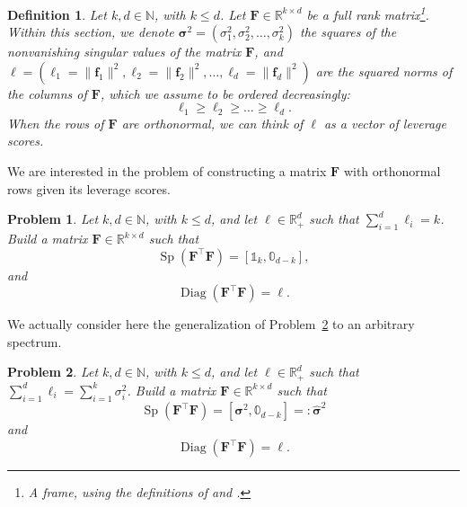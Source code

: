 \documentclass[twoside,11pt]{book}
\newtheorem{definition}{Definition}
\newtheorem{problem}{Problem}
\numberwithin{theorem}{chapter}
\numberwithin{definition}{chapter}
\numberwithin{proposition}{chapter}
\numberwithin{corollary}{chapter}
\numberwithin{example}{chapter}
\numberwithin{lemma}{chapter}
\numberwithin{assumption}{chapter}
\numberwithin{equation}{chapter}
\numberwithin{figure}{chapter}
\DeclareMathOperator{\Sp}{\mathrm{Sp}}
\DeclareMathOperator{\Diag}{\mathrm{Diag}}
\DeclareMathOperator{\Tran}{\intercal}
\begin{document}
\begin{subappendices}
\begin{definition}
Let $k, d \in \mathbb{N}$, with $k \leq d$. Let $\bm{F} \in \mathbb{R}^{k \times d}$ be a full rank matrix\footnote{A \emph{frame}, using the definitions of \citep{FiMiPo11} and \citep{FMPS13}.}.
Within this section, we denote $\bm{\sigma}^2 = (\sigma_{1}^2, \sigma_{2}^2, \dots ,\sigma_{k}^2)$ the squares of the nonvanishing singular values of the matrix $\bm{F}$, and $\bm{\ell} = (\ell_{1}=\|\bm{f}_{1}\|^{2}, \ell_{2}=\|\bm{f}_{2}\|^{2}, \dots, \ell_{d}=\|\bm{f}_{d}\|^{2})$ are the squared norms of the columns of $\bm{F}$, which we assume to be ordered decreasingly:
$$\ell_{1} \geq \ell_{2} \geq \dots \geq \ell_{d}.$$
 When the rows of $\bm{F}$ are orthonormal, we can think of $\bm{\ell}$ as a vector of leverage scores.
\end{definition}

We are interested in the problem of constructing a matrix $\bm{F}$ with orthonormal rows given its leverage scores.
\begin{problem}\label{prob:orthogonal_frame_existence}
Let $k,d \in \mathbb{N}$, with $k \leq d$, and let $\bm{\ell} \in \mathbb{R}_{+}^{d}$ such that $\sum\limits_{i =1}^{d} \ell_{i} = k$. Build a matrix $\bm{F} \in \mathbb{R}^{k\times d}$ such that
\begin{equation}
\Sp(\bm{F}^{\Tran}\bm{F}) = [\mathbb{1}_{k},\mathbb{0}_{d-k}],
\end{equation}
and
\begin{equation}
\Diag(\bm{F}^{\Tran}\bm{F}) = \bm{\ell}.
\end{equation}
\end{problem}
We actually consider here the generalization of Problem~\ref{prob:general_frame_existence} to an arbitrary spectrum.

\begin{problem}\label{prob:general_frame_existence}
Let $k,d \in \mathbb{N}$, with $k \leq d$, and let $\bm{\ell} \in \mathbb{R}_{+}^{d}$ such that $\sum\limits_{i =1}^{d} \ell_{i} = \sum\limits_{i = 1}^{k} \sigma_{i}^2$. Build a matrix $\bm{F} \in \mathbb{R}^{k\times d}$ such that
\begin{equation}
\Sp(\bm{F}^{\Tran}\bm{F}) = [\bm{\sigma}^2,\mathbb{0}_{d-k}] =:\bm{\hat\sigma}^2
\end{equation}
and
\begin{equation}
\Diag(\bm{F}^{\Tran}\bm{F}) = \bm{\ell}.
\end{equation}
\end{problem}


\end{subappendices}
\end{document}
